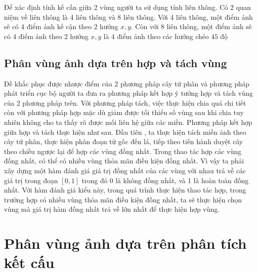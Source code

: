 \documentclass[12pt,oneside,a4]{report}
\begin{document}
Để xác định tính kế cần giữa 2 vùng người ta sử dụng tính liên thông. Có 2 quan niệm về liên thông là 4 liên thông và 8 liên thông. Với 4 liên thông,  một điểm ảnh sẽ có 4 điểm ảnh kế cận theo 2 hướng $x,y$. Còn với 8 liên thông, một điểm ảnh sẽ có 4 điểm ảnh theo 2 hướng $x,y$ là 4 điểm ảnh theo các hướng chéo $45$ độ
\subsection{Phân vùng ảnh dựa trên hợp và tách vùng}
Đề khắc phục được nhược điểm của 2 phương pháp cây tứ phân và phương pháp phát triển cục bộ người ta đưa ra phương pháp kết hợp ý tưởng hợp và tách vùng của 2 phương pháp trên. Với phương pháp tách, việc thực hiện chia quá chi tiết còn với phương pháp hợp mặc dù giảm được tối thiểu số vùng sau khi chia tuy nhiên không cho ta thấy rõ được mối liên hệ giữa các miền.
Phương pháp kết hợp giữa hợp và tách thực hiện như sau. Đầu tiên , ta thực hiện tách miền ảnh theo cây tứ phân, thực hiện phân đoạn từ gốc đến lá, tiếp theo tiến hành duyệt cây theo chiều ngược lại để hợp các vùng đồng nhất. Trong thao tác hợp các vùng đồng nhất, có thể có nhiều vùng thỏa mãn điều kiện đồng nhất. Vì vậy ta phải xây dựng một hàm đánh giá giá trị đồng nhất của các vùng với nhau trả về các giá trị trong đoạn $[0,1]$ trong  đó 0 là không đồng nhất, và 1 là hoàn toàn đồng nhất. Với hàm đánh giá kiểu này,  trong quá trình thực hiện thao tác hợp, trong trường hợp có nhiều vùng thỏa mãn điều kiện đồng nhất, ta sẽ thực hiện chọn vùng mà giá trị hàm đồng nhất trả về lớn nhất để thực hiện hợp vùng.
\section{Phân vùng ảnh dựa trên phân tích kết cấu}
\end{document}
